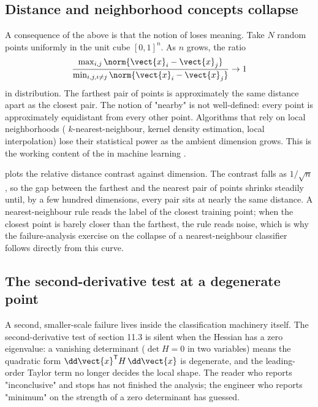 \subsection{Distance and neighborhood concepts collapse}

A consequence of the above is that the notion of  loses meaning. Take $N$ random points uniformly in the
unit cube $[0, 1]^{n}$. As $n$ grows, the ratio
\[
\frac{\max_{i, j} \norm{\vect{x}_{i} - \vect{x}_{j}}}
{\min_{i, j, i \neq j} \norm{\vect{x}_{i} - \vect{x}_{j}}}
\to 1
\]
in distribution. The farthest pair of points is approximately the
same distance apart as the closest pair. The notion of "nearby" is
not well-defined: every point is approximately equidistant from
every other point. Algorithms that rely on local neighborhoods (
$k$-nearest-neighbour, kernel density estimation, local
interpolation) lose their statistical power as the ambient
dimension grows. This is the working content of the
 in machine learning
\cite{paper:v2ch11-blum-curse-1997}.



 plots the relative distance
contrast against dimension. The contrast falls as $1/\sqrt{n}$, so the
gap between the farthest and the nearest pair of points shrinks steadily
until, by a few hundred dimensions, every pair sits at nearly the same
distance. A nearest-neighbour rule reads the label of the closest
training point; when the closest point is barely closer than the
farthest, the rule reads noise, which is why the failure-analysis
exercise on the collapse of a nearest-neighbour classifier follows
directly from this curve.

\subsection{The second-derivative test at a degenerate point}

A second, smaller-scale failure lives inside the classification
machinery itself. The second-derivative test of section 11.3 is
silent when the Hessian has a zero eigenvalue: a vanishing
determinant ($\det H = 0$ in two variables) means the quadratic form
$\dd\vect{x}^{\mathsf{T}} H\,\dd\vect{x}$ is degenerate, and the
leading-order Taylor term no longer decides the local shape. The
reader who reports "inconclusive" and stops has not finished the
analysis; the engineer who reports "minimum" on the strength of a
zero determinant has guessed.

